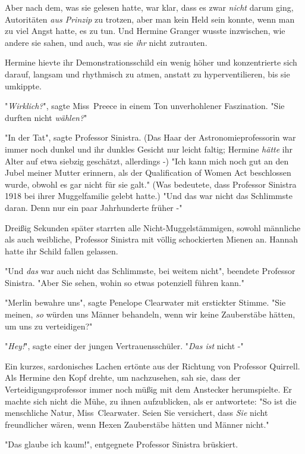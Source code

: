 {Aber nach dem, was sie gelesen hatte, war klar, dass es zwar \emph{nicht} darum ging, Autoritäten \emph{aus Prinzip} zu trotzen, aber man kein Held sein konnte, wenn man zu viel Angst hatte, es zu tun. Und Hermine Granger wusste inzwischen, wie andere sie sahen, und auch, was sie \emph{ihr} nicht zutrauten.

Hermine hievte ihr Demonstrationsschild ein wenig höher und konzentrierte sich darauf, langsam und rhythmisch zu atmen, anstatt zu hyperventilieren, bis sie umkippte.

"\emph{Wirklich?}", sagte Miss~Preece in einem Ton unverhohlener Faszination. "Sie durften nicht \emph{wählen?}"

"In der Tat", sagte Professor Sinistra. (Das Haar der Astronomieprofessorin war immer noch dunkel und ihr dunkles Gesicht nur leicht faltig; Hermine \emph{hätte} ihr Alter auf etwa siebzig geschätzt, allerdings -) "Ich kann mich noch gut an den Jubel meiner Mutter erinnern, als der Qualification of Women Act beschlossen wurde, obwohl es gar nicht für sie galt." (Was bedeutete, dass Professor Sinistra 1918 bei ihrer Muggelfamilie gelebt hatte.) "Und das war nicht das Schlimmste daran. Denn nur ein paar Jahrhunderte früher -"

Dreißig Sekunden später starrten alle Nicht-Muggelstämmigen, sowohl männliche als auch weibliche, Professor Sinistra mit völlig schockierten Mienen an. Hannah hatte ihr Schild fallen gelassen.

"Und \emph{das} war auch nicht das Schlimmste, bei weitem nicht", beendete Professor Sinistra. "Aber Sie sehen, wohin so etwas potenziell führen kann."

"Merlin bewahre uns", sagte Penelope Clearwater mit erstickter Stimme. "Sie meinen, \emph{so} würden uns Männer behandeln, wenn wir keine Zauberstäbe hätten, um uns zu verteidigen?"

"\emph{Hey!}", sagte einer der jungen Vertrauensschüler. "\emph{Das ist} nicht -"

Ein kurzes, sardonisches Lachen ertönte aus der Richtung von Professor Quirrell. Als Hermine den Kopf drehte, um nachzusehen, sah sie, dass der Verteidigungsprofessor immer noch müßig mit dem Anstecker herumspielte. Er machte sich nicht die Mühe, zu ihnen aufzublicken, als er antwortete: "So ist die menschliche Natur, Miss~Clearwater. Seien Sie versichert, dass \emph{Sie} nicht freundlicher wären, wenn Hexen Zauberstäbe hätten und Männer nicht."

"Das glaube ich kaum!", entgegnete Professor Sinistra brüskiert.

}
